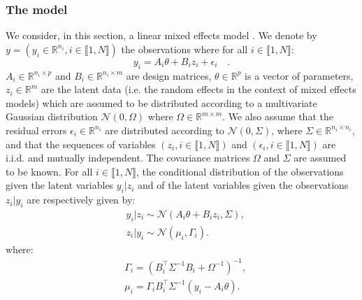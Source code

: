 \documentclass[11pt]{article}
\theoremstyle{plain}
\newcommand{\loglike}{\ell}
\newcommand{\inter}{\llbracket1,N\rrbracket}
\newcommand{\rset}{\mathbb{R}}
\theoremstyle{plain}
\theoremstyle{definition}
\begin{document}
\subsubsection{The model}
We consider, in this section, a linear mixed effects model \citep{lavielle2014Mixed}.
We denote by $y = (y_i \in \rset^{n_i}, i \in \inter)$ the observations where for all $i \in \inter$:
\begin{equation}
y_i = A_i\theta + B_iz_i + \epsilon_i \quad.
\end{equation}
$A_i \in \mathbb{R}^{n_i \times p}$ and $B_i \in \mathbb{R}^{n_i \times m}$ are design matrices, $\theta \in \mathbb{R}^{p}$ is a vector of parameters, $z_i \in \mathbb{R}^{m}$ are the latent data (i.e. the random effects in the context of mixed effects models) which are assumed to be distributed according to a multivariate Gaussian distribution $\mathcal{N}(0,\Omega)$ where $\Omega \in \mathbb{R}^{m \times m}$. We also assume that the residual errors $\epsilon_i \in \mathbb{R}^{n_i}$ are distributed according to $\mathcal{N}(0,\Sigma)$, where $\Sigma \in \mathbb{R}^{n_i \times n_i}$, and that the sequences of variables $(z_i, i \in \inter)$ and $(\epsilon_i, i \in \inter)$ are i.i.d. and mutually independent. The covariance matrices $\Omega$ and $\Sigma$ are assumed to be known. For all $i \in \inter$, the conditional distribution of the observations given the latent variables $y_i|z_i$ and of the latent variables given the observations $z_i|y_i$ are respectively given by:
\begin{align}
& y_i|z_i \sim \mathcal{N}(A_i\theta + B_iz_i,\Sigma),\\
& z_i|y_i \sim \mathcal{N}(\mu_i, \Gamma_i).
\end{align}
where:
\begin{align}\label{posteriormean}
&\Gamma_i =  (B_i^\top \Sigma^{-1} B_i + \Omega^{-1})^{-1},\\
&\mu_i = \Gamma_i B_i^\top\Sigma^{-1} (y_i - A_i\theta).
\end{align}
\end{document}
